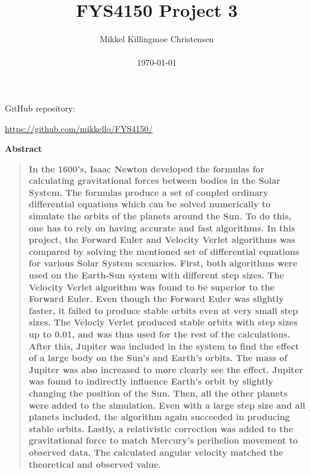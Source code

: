 \documentclass[10pt,a4paper,titlepage]{article}
\title{FYS4150 Project 3}
\author
{Mikkel Killingmoe Christensen\\
\\
\normalsize{\today}
}
\date{}
\newenvironment{sciabstract}{%
\begin{quote} \bf}
{\end{quote}}
\begin{document}
 




\maketitle 
\begin{center}
\par GitHub repository:
\par \url{https://github.com/mikkello/FYS4150/}
\end{center}



\begin{center}
{\large \textbf{Abstract}}
\end{center}
\begin{sciabstract}
In the 1600's, Isaac Newton developed the formulas for calculating gravitational forces between bodies in the Solar System. The formulas produce a set of coupled ordinary differential equations which can be solved numerically to simulate the orbits of the planets around the Sun. To do this, one has to rely on having accurate and fast algorithms. In this project, the Forward Euler and Velocity Verlet algorithms was compared by solving the mentioned set of differential equations for various Solar System scenarios. First, both algorithms were used on the Earth-Sun system with different step sizes. The Velocity Verlet algorithm was found to be superior to the Forward Euler. Even though the Forward Euler was slightly faster, it failed to produce stable orbits even at very small step sizes. The Velociy Verlet produced stable orbits with step sizes up to 0.01, and was thus used for the rest of the calculations.  After this, Jupiter was included in the system to find the effect of a large body on the Sun's and Earth's orbits. The mass of Jupiter was also increased to more clearly see the effect. Jupiter was found to indirectly influence Earth's orbit by slightly changing the position of the Sun. Then, all the other planets were added to the simulation. Even with a large step size and all planets included, the algorithm again succeeded in producing stable orbits. Lastly, a relativistic correction was added to the gravitational force to match Mercury's perihelion movement to observed data. The calculated angular velocity matched the theoretical and observed value. 
\end{sciabstract}
\end{document}
